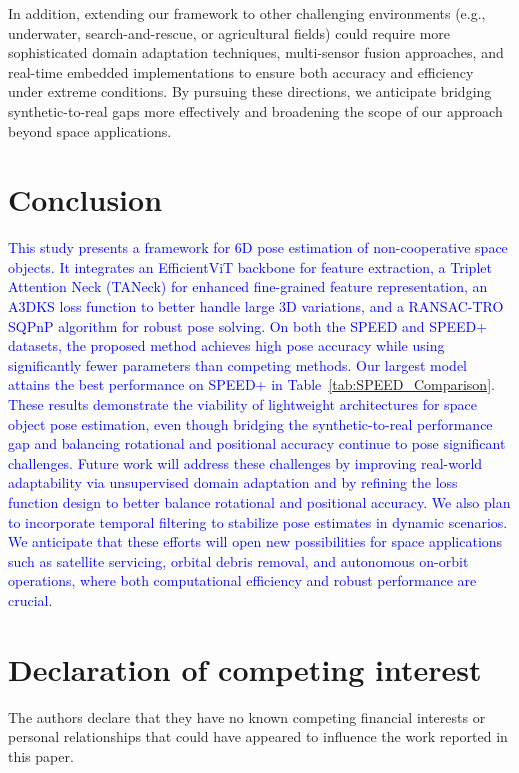 \documentclass[a4paper,fleqn]{cas-sc}
\begin{document}
In addition, extending our framework to other challenging environments (e.g., 
underwater, search-and-rescue, or agricultural fields) could require more sophisticated 
domain adaptation techniques, multi-sensor fusion approaches, and real-time embedded 
implementations to ensure both accuracy and efficiency under extreme conditions. 
By pursuing these directions, we anticipate bridging synthetic-to-real gaps more effectively 
and broadening the scope of our approach beyond space applications.

\section{Conclusion} \label{sec:conclusion}
\textcolor{blue}{
This study presents a framework for 6D pose estimation of non-cooperative space objects. It integrates an EfficientViT backbone for feature extraction, a Triplet Attention Neck (TANeck) for enhanced fine-grained feature representation, an A3DKS loss function to better handle large 3D variations, and a RANSAC-TRO SQPnP algorithm for robust pose solving.
On both the SPEED and SPEED+ datasets, the proposed method achieves high pose accuracy while using significantly fewer parameters than competing methods. Our largest model attains the best performance on SPEED+ in Table~\ref{tab:SPEED_Comparison}. These results demonstrate the viability of lightweight architectures for space object pose estimation, even though bridging the synthetic-to-real performance gap and balancing rotational and positional accuracy continue to pose significant challenges.
Future work will address these challenges by improving real-world adaptability via unsupervised domain adaptation and by refining the loss function design to better balance rotational and positional accuracy. We also plan to incorporate temporal filtering to stabilize pose estimates in dynamic scenarios. We anticipate that these efforts will open new possibilities for space applications such as satellite servicing, orbital debris removal, and autonomous on-orbit operations, where both computational efficiency and robust performance are crucial.
}
\section*{Declaration of competing interest}

The authors declare that they have no known competing financial interests or personal relationships that could have appeared to influence the work reported in this paper.
\end{document}
